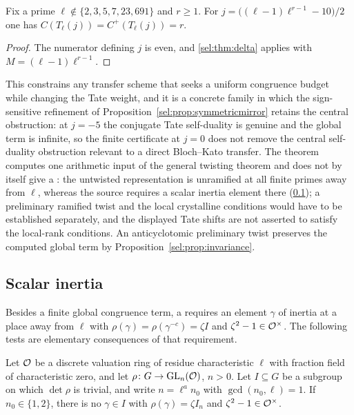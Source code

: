 \begin{corollary}\label{sel:cor:tateweight}
Fix a prime $\ell\notin\{2,3,5,7,23,691\}$ and $r\ge1$. For
$j=\bigl((\ell-1)\ell^{r-1}-10\bigr)/2$ one has
$C(T_\ell(j))=C^+(T_\ell(j))=r$.
\end{corollary}

\begin{proof}
The numerator defining $j$ is even, and \cref{sel:thm:delta} applies with
$M=(\ell-1)\ell^{r-1}$.
\end{proof}

This constrains any transfer scheme that seeks a uniform congruence budget
while changing the Tate weight, and it is a concrete family in which the
sign-sensitive refinement of Proposition~\ref{sel:prop:symmetricmirror} retains the
central obstruction: at $j=-5$ the conjugate Tate self-duality is genuine
and the global term is infinite, so the finite certificate at $j=0$ does
not remove the central self-duality obstruction relevant to a direct
Bloch--Kato transfer. The theorem computes one arithmetic input of the
general twisting theorem and does not by itself give a :
the untwisted representation is unramified at all finite primes away from
$\ell$, whereas the source requires a scalar inertia element there
(\cref{sel:sec:inertia}); a preliminary ramified twist and the local
crystalline conditions would have to be established separately, and the
displayed Tate shifts are not asserted to satisfy the local-rank
conditions. An anticyclotomic preliminary twist preserves the computed
global term by Proposition~\ref{sel:prop:invariance}.

\subsection{Scalar inertia}\label{sel:sec:inertia}

Besides a finite global congruence term, a  requires an
element $\gamma$ of inertia at a place away from $\ell$ with
$\rho(\gamma)=\rho(\gamma^{-c})=\zeta I$ and $\zeta^2-1\in\mathcal{O}^\times$. The
following tests are elementary consequences of that requirement.

\begin{proposition}\label{sel:prop:rankdet}
Let $\mathcal{O}$ be a discrete valuation ring of residue characteristic $\ell$ with
fraction field of characteristic zero, and let
$\rho\colon G\to\operatorname{GL}_n(\mathcal{O})$, $n>0$. Let $I\subseteq G$ be a subgroup on
which $\det\rho$ is trivial, and write $n=\ell^an_0$ with
$\gcd(n_0,\ell)=1$. If $n_0\in\{1,2\}$, there is no $\gamma\in I$ with
$\rho(\gamma)=\zeta I_n$ and $\zeta^2-1\in\mathcal{O}^\times$.
\end{proposition}

